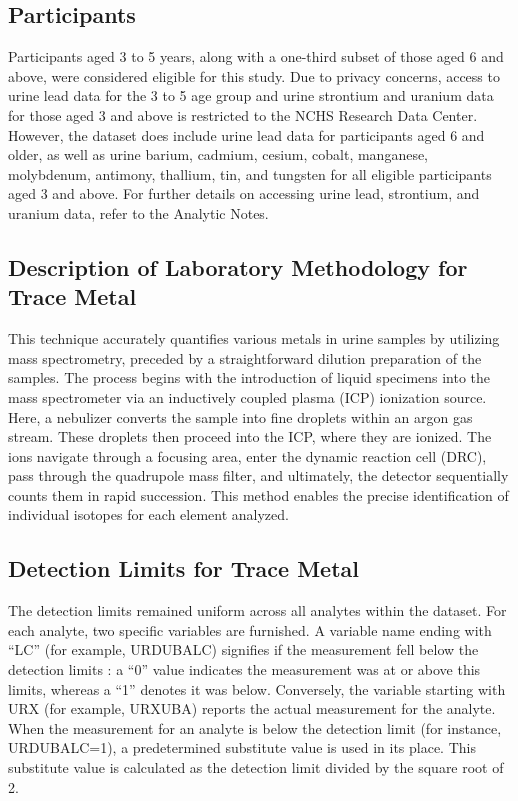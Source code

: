 \documentclass[
  man,floatsintext]{apa6}
\begin{document}
\hypertarget{participants}{%
\subsection{Participants}\label{participants}}

Participants aged 3 to 5 years, along with a one-third subset of those aged 6 and above, were considered eligible for this study. Due to privacy concerns, access to urine lead data for the 3 to 5 age group and urine strontium and uranium data for those aged 3 and above is restricted to the NCHS Research Data Center. However, the dataset does include urine lead data for participants aged 6 and older, as well as urine barium, cadmium, cesium, cobalt, manganese, molybdenum, antimony, thallium, tin, and tungsten for all eligible participants aged 3 and above. For further details on accessing urine lead, strontium, and uranium data, refer to the Analytic Notes.

\hypertarget{description-of-laboratory-methodology-for-trace-metal}{%
\subsection{Description of Laboratory Methodology for Trace Metal}\label{description-of-laboratory-methodology-for-trace-metal}}

This technique accurately quantifies various metals in urine samples by utilizing mass spectrometry, preceded by a straightforward dilution preparation of the samples. The process begins with the introduction of liquid specimens into the mass spectrometer via an inductively coupled plasma (ICP) ionization source. Here, a nebulizer converts the sample into fine droplets within an argon gas stream. These droplets then proceed into the ICP, where they are ionized. The ions navigate through a focusing area, enter the dynamic reaction cell (DRC), pass through the quadrupole mass filter, and ultimately, the detector sequentially counts them in rapid succession. This method enables the precise identification of individual isotopes for each element analyzed.

\hypertarget{detection-limits-for-trace-metal}{%
\subsection{Detection Limits for Trace Metal}\label{detection-limits-for-trace-metal}}

The detection limits remained uniform across all analytes within the dataset. For each analyte, two specific variables are furnished. A variable name ending with ``LC'' (for example, URDUBALC) signifies if the measurement fell below the detection limits : a ``0'' value indicates the measurement was at or above this limits, whereas a ``1'' denotes it was below. Conversely, the variable starting with URX (for example, URXUBA) reports the actual measurement for the analyte. When the measurement for an analyte is below the detection limit (for instance, URDUBALC=1), a predetermined substitute value is used in its place. This substitute value is calculated as the detection limit divided by the square root of 2.
\end{document}
